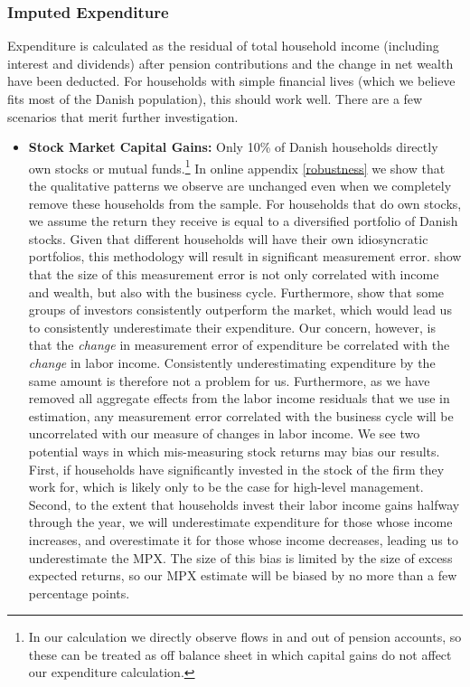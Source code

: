 \documentclass[titlepage]{\econtex}\newcommand{\texname}{ConsumptionHeterogeneity}
\begin{document}
\subsubsection{Imputed Expenditure}
Expenditure is calculated as the residual of total household income (including interest and dividends) after pension contributions and the change in net wealth have been deducted. For households with simple financial lives (which we believe fits most of the Danish population), this should work well. There are a few scenarios that merit further investigation.
\begin{itemize}
	\item \textbf{Stock Market Capital Gains:} Only 10\% of Danish households directly own stocks or mutual funds.\footnote{In our calculation we directly observe flows in and out of pension accounts, so these can be treated as off balance sheet in which capital gains do not affect our expenditure calculation.} In online appendix \ref{robustness} we show that the qualitative patterns we observe are unchanged even when we completely remove these households from the sample. For households that do own stocks, we assume the return they receive is equal to a diversified portfolio of Danish stocks. Given that different households will have their own idiosyncratic portfolios, this methodology will result in significant measurement error. \cite{baker_measurement_2018} show that the size of this measurement error is not only correlated with income and wealth, but also with the business cycle. Furthermore, \cite{fagereng_persistence_2016} show that some groups of investors consistently outperform the market, which would lead us to consistently underestimate their expenditure. Our concern, however, is that the \textit{change} in measurement error of expenditure be correlated with the \textit{change} in labor income. Consistently underestimating expenditure by the same amount is therefore not a problem for us. Furthermore, as we have removed all aggregate effects from the labor income residuals that we use in estimation, any measurement error correlated with the business cycle will be uncorrelated with our measure of changes in labor income. We see two potential ways in which mis-measuring stock returns may bias our results. First, if households have significantly invested in the stock of the firm they work for, which is likely only to be the case for high-level management. Second, to the extent that households invest their labor income gains halfway through the year, we will underestimate expenditure for those whose income increases, and overestimate it for those whose income decreases, leading us to underestimate the MPX. The size of this bias is limited by the size of excess expected returns, so our MPX estimate will be biased by no more than a few percentage points.

\end{itemize}
\end{document}
